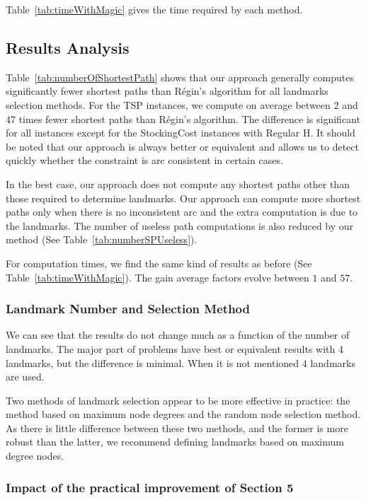 Table~\ref{tab:timeWithMagic} gives the time required by each method.

\subsection{Results Analysis}

Table~\ref{tab:numberOfShortestPath} shows that our approach generally computes significantly fewer shortest paths than Régin's algorithm for all landmarks selection methods. For the TSP instances, we compute on average between 2 and 47 times fewer shortest paths than Régin's algorithm. The difference is significant for all instances except for the StockingCost instances with Regular H.
It should be noted that our approach is always better or equivalent and allows us to detect quickly whether the constraint is arc consistent in certain cases.

In the best case, our approach does not compute any shortest paths other than those required to determine landmarks. Our approach can compute more shortest paths only when there is no inconsistent arc and the extra computation is due to the landmarks.
The number of useless path computations is also reduced by our method (See Table~\ref{tab:numberSPUseless}).

For computation times, we find the same kind of results as before (See Table~\ref{tab:timeWithMagic}). The gain average factors evolve between $1$ and $57$. 

\subsubsection{Landmark Number and Selection Method}

We can see that the results do not change much as a function of the number of landmarks.
The major part of problems have best or equivalent results with 4 landmarks, but the difference is minimal. When it is not mentioned $4$ landmarks are used. 

Two methods of landmark selection appear to be more effective in practice: the method based on maximum node degrees and the random node selection method. As there is little difference between these two methods, and the former is more robust than the latter, we recommend defining landmarks based on maximum degree nodes. 

\subsubsection{Impact of the practical improvement of Section 5}

